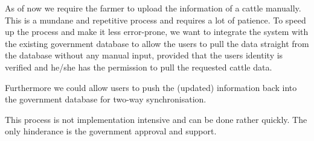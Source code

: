 As of now we require the farmer to upload the information of a cattle manually. This is a mundane and repetitive process and requires a lot of patience. To speed up the process and make it less error-prone, we want to integrate the system with the existing government database to allow the users to pull the data straight from the database without any manual input, provided that the users identity is verified and he/she has the permission to pull the requested cattle data.

Furthermore we could allow users to push the (updated) information back into the government database for two-way synchronisation.

This process is not implementation intensive and can be done rather quickly. The only hinderance is the government approval and support.

